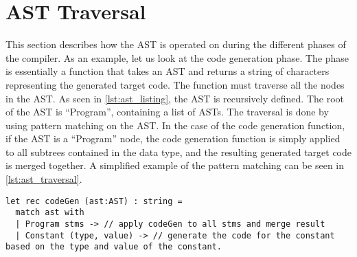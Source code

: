 \section{AST Traversal}

This section describes how the AST is operated on during the different phases of the compiler. As an example, let us look at the code generation phase. The phase is essentially a function that takes an AST and returns a string of characters representing the generated target code. The function must traverse all the nodes in the AST. As seen in \cref{lst:ast_listing}, the AST is recursively defined. The root of the AST is \enquote{Program}, containing a list of ASTs. The traversal is done by using pattern matching on the AST. In the case of the code generation function, if the AST is a \enquote{Program} node, the code generation function is simply applied to all subtrees contained in the data type, and the resulting generated target code is merged together. A simplified example of the pattern matching can be seen in \cref{lst:ast_traversal}.

\begin{lstlisting}[style = fsharp, label = lst:ast_traversal, caption = {Example of traversing AST}]
let rec codeGen (ast:AST) : string =
  match ast with
  | Program stms -> // apply codeGen to all stms and merge result
  | Constant (type, value) -> // generate the code for the constant based on the type and value of the constant.
\end{lstlisting}
